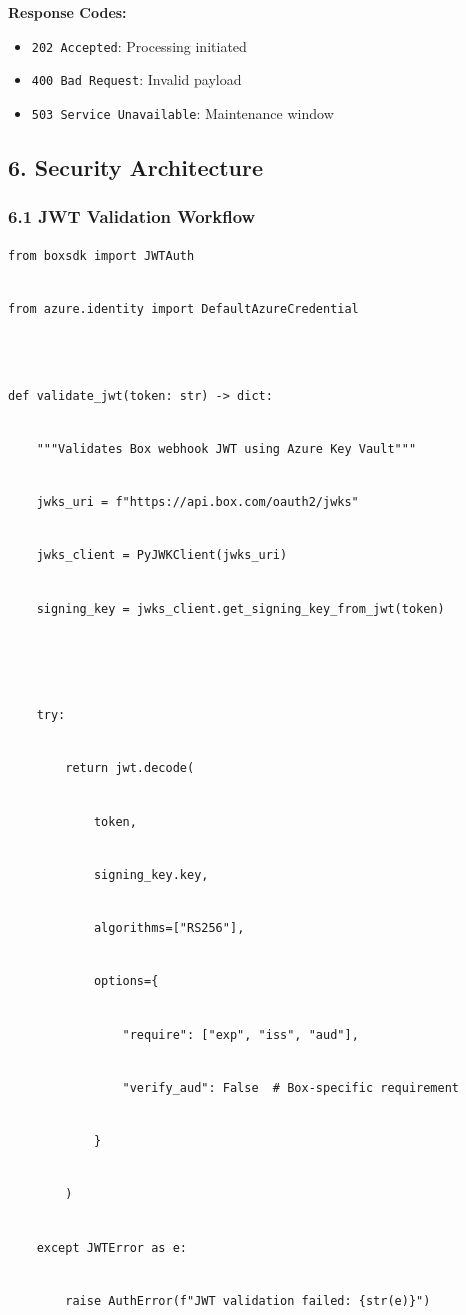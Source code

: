 \documentclass[
]{article}
\providecommand{\tightlist}{%
  \setlength{\itemsep}{0pt}\setlength{\parskip}{0pt}}
\begin{document}
\textbf{Response Codes:}

\begin{itemize}
\tightlist
\item
  \texttt{202\ Accepted}: Processing initiated
\item
  \texttt{400\ Bad\ Request}: Invalid payload
\item
  \texttt{503\ Service\ Unavailable}: Maintenance window
\end{itemize}

\hypertarget{security-architecture}{%
\subsection{\texorpdfstring{\textbf{6. Security
Architecture}}{6. Security Architecture}}\label{security-architecture}}

\hypertarget{jwt-validation-workflow}{%
\subsubsection{\texorpdfstring{\textbf{6.1 JWT Validation
Workflow}}{6.1 JWT Validation Workflow}}\label{jwt-validation-workflow}}

\texttt{from\ boxsdk\ import\ JWTAuth}\strut \\
\texttt{from\ azure.identity\ import\ DefaultAzureCredential}\strut \\
\strut \\
\texttt{def\ validate\_jwt(token:\ str)\ -\textgreater{}\ dict:}\strut \\
\texttt{\ \ \ \ """Validates\ Box\ webhook\ JWT\ using\ Azure\ Key\ Vault"""}\strut \\
\texttt{\ \ \ \ jwks\_uri\ =\ f"https://api.box.com/oauth2/jwks"}\strut \\
\texttt{\ \ \ \ jwks\_client\ =\ PyJWKClient(jwks\_uri)}\strut \\
\texttt{\ \ \ \ signing\_key\ =\ jwks\_client.get\_signing\_key\_from\_jwt(token)}\strut \\
\texttt{\ \ \ \ }\strut \\
\texttt{\ \ \ }\texttt{\ try:}\strut \\
\texttt{\ \ \ \ \ \ \ \ return\ jwt.decode(}\strut \\
\texttt{\ \ \ \ \ \ \ \ \ \ \ \ token,}\strut \\
\texttt{\ \ \ \ \ \ \ \ \ \ \ \ signing\_key.key,}\strut \\
\texttt{\ \ \ \ \ \ \ \ \ \ \ \ algorithms={[}"RS256"{]},}\strut \\
\texttt{\ \ \ \ \ \ \ \ \ \ \ \ options=\{}\strut \\
\texttt{\ \ \ \ \ \ \ \ \ \ \ \ \ \ \ \ "require":\ {[}"exp",\ "iss",\ "aud"{]},}\strut \\
\texttt{\ \ \ \ \ \ \ \ \ \ \ \ \ \ \ \ "verify\_aud":\ False\ \ \#\ Box-specific\ requirement}\strut \\
\texttt{\ \ \ \ \ }\texttt{\ \ \ \ \ \ \ \}}\strut \\
\texttt{\ \ \ \ \ \ \ \ )}\strut \\
\texttt{\ \ \ \ except\ JWTError\ as\ e:}\strut \\
\texttt{\ \ \ \ \ \ \ \ raise\ AuthError(f"JWT\ validation\ failed:\ \{str(e)\}")}
\end{document}
